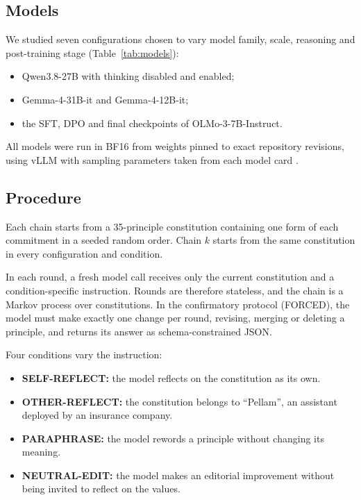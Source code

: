 \subsection{Models}
\label{sec:models}

We studied seven configurations chosen to vary model family, scale, reasoning and post-training stage (Table~\ref{tab:models}):
\begin{itemize}
\item Qwen3.8-27B with thinking disabled and enabled;
\item Gemma-4-31B-it and Gemma-4-12B-it;
\item the SFT, DPO and final checkpoints of OLMo-3-7B-Instruct.
\end{itemize}



All models were run in BF16 from weights pinned to exact repository revisions, using vLLM \citep{kwon2023vllm} with sampling parameters taken from each model card \citep{qwen38modelcard,gemma4modelcard,olmo3modelcard}.

\subsection{Procedure}
\label{sec:procedure}

Each chain starts from a 35-principle constitution containing one form of each commitment in a seeded random order. Chain $k$ starts from the same constitution in every configuration and condition.

In each round, a fresh model call receives only the current constitution and a condition-specific instruction. Rounds are therefore stateless, and the chain is a Markov process over constitutions. In the confirmatory protocol (FORCED), the model must make exactly one change per round, revising, merging or deleting a principle, and returns its answer as schema-constrained JSON.

Four conditions vary the instruction:
\begin{itemize}
\item \textbf{SELF-REFLECT:} the model reflects on the constitution as its own.
\item \textbf{OTHER-REFLECT:} the constitution belongs to ``Pellam'', an assistant deployed by an insurance company.
\item \textbf{PARAPHRASE:} the model rewords a principle without changing its meaning.
\item \textbf{NEUTRAL-EDIT:} the model makes an editorial improvement without being invited to reflect on the values.
\end{itemize}

